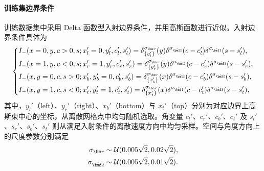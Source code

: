\paragraph{训练集边界条件}
训练数据集中采用 Delta 函数型入射边界条件，并用高斯函数进行近似。入射边界条件具体为
\begin{equation}\label{eq:bc-condition}
    \centering
    \left \{ %
    \begin{aligned}
         & I_-(x=0,y,c>0,s;x_l^{\prime}=0,
        y_l^{\prime},c_l^{\prime},s_l^{\prime})
        =\delta_{\{y_l^{\prime}\}}^{\sigma_{\br}}(y)\delta^{\sigma_{\bOmega}}(c - c_l')\delta^{\sigma_{\bOmega}}(s - s_l'),
        \\
         & I_-(x=1,y,c<0,s;x_r^{\prime}=1,
        y_r^{\prime},c_r^{\prime},s_r^{\prime})
        =\delta_{\{y_r^{\prime}\}}^{\sigma_{\br}}(y)\delta^{\sigma_{\bOmega}}(c - c_r')\delta^{\sigma_{\bOmega}}(s - s_r'),
        \\
         & I_-(x,y=0,c,s>0;x_b^{\prime},y_b^{\prime}=0, c_b^{\prime},
        s_b^{\prime})
        =\delta_{\{x_b^{\prime}\}}^{\sigma_{\br}}(x)\delta^{\sigma_{\bOmega}}(c - c_b')\delta^{\sigma_{\bOmega}}(s - s_b'),
        \\
         & I_-(x,y=1,c,s<0;x_t^{\prime},y_t^{\prime}=1,c_t^{\prime},
        s_t^{\prime})
        =\delta_{\{x_t^{\prime}\}}^{\sigma_{\br}}(x)\delta^{\sigma_{\bOmega}}(c - c_t')\delta^{\sigma_{\bOmega}}(s - s_t'),
    \end{aligned}
    \right. %
\end{equation}
其中，$y_l'$（left）、$y_r'$（right）、$x_b'$（bottom）与 $x_t'$（top）分别为对应边界上高斯束中心的坐标，从离散网格点中均匀随机选取。角变量 $c_l'$、$c_r'$、$c_b'$、$c_t'$ 及 $s_l'$、$s_r'$、$s_b'$、$s_t'$ 则从满足入射条件的离散速度方向中均匀采样。空间与角度方向上的尺度参数分别满足
\begin{equation}
    \begin{aligned}
        \sigma_{\br}     & \sim \mathcal{U}(0.005\sqrt{2},0.02\sqrt{2}), \\
        \sigma_{\bOmega} & \sim \mathcal{U}(0.005\sqrt{2},0.01\sqrt{2}).
    \end{aligned}
\end{equation}

